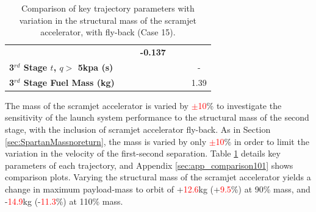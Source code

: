 \begin{table}[ht]
\begin{tabular}{l c c c c c c}
	& \textbf{\thirddExergyEffmSPARTANOneHundredFive}
	& \textbf{\thirddExergyEffmSPARTANOneHundredTen}
	& \textbf{-0.137}
	\\
	\textbf{3$^{rd}$ Stage $t$, $q >$ 5kpa (s)}
	& \thirdqOverFivemSPARTANNinety
	& \thirdqOverFivemSPARTANNinetyFive
	& \thirdqOverFivemSPARTANStandard
	& \thirdqOverFivemSPARTANOneHundredFive
	& \thirdqOverFivemSPARTANOneHundredTen
	& -
	\\
	\textbf{3$^{rd}$ Stage Fuel Mass (kg)}
	& \thirdmFuelmSPARTANNinety
	& \thirdmFuelmSPARTANNinetyFive
	& \thirdmFuelmSPARTANStandard
	& \thirdmFuelmSPARTANOneHundredFive
	& \thirdmFuelmSPARTANOneHundredTen
	&1.39
	\\
	\hline 
\end{tabular} 
\caption{Comparison of key trajectory parameters with variation in the structural mass of the scramjet accelerator, with fly-back (Case 15).}
\label{tab:comparison101}
\end{table}



The mass of the scramjet accelerator is varied by \textcolor{red}{$\pm$10}\% to investigate the sensitivity of the launch system performance to the structural mass of the second stage, with the inclusion of scramjet accelerator fly-back. As in Section \ref{sec:SpartanMassnoreturn}, the mass is varied by only \textcolor{red}{$\pm$10}\% in order to limit the variation in the velocity of the first-second separation.
Table \ref{tab:comparison101} details key parameters of each trajectory, and Appendix \ref{sec:app_comparison101} shows comparison plots.
Varying the structural mass of the scramjet accelerator yields a change in maximum payload-mass to orbit of +\textcolor{red}{12.6}kg (+\textcolor{red}{9.5}\%) at 90\% mass, and -\textcolor{red}{14.9}kg (-\textcolor{red}{11.3}\%) at 110\% mass. 


